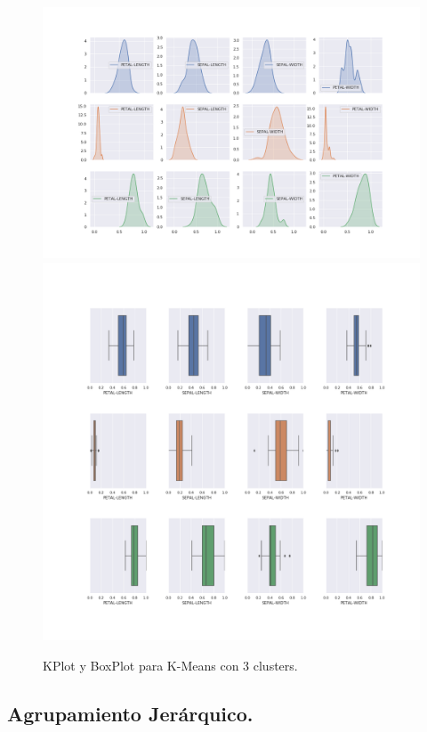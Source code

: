 \documentclass[a4paper, 20pt]{article}
\begin{document}
\begin{figure}[h]
\centering
\includegraphics[scale=0.4]{dani/kdeplotK-MeansIRIS.png}
\includegraphics[scale=0.32]{dani/boxplotK-MeansIRIS.png}
\caption{KPlot y BoxPlot para K-Means con 3 clusters.}
\label{kpkm}
\end{figure}

\clearpage

\subsection{Agrupamiento Jerárquico.}
\end{document}

